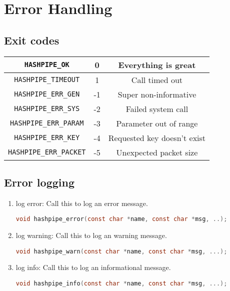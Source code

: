 \documentclass[12pt]{article}
\def\clst{\lstinline[basicstyle=\ttfamily,breaklines=true,language=C]}
\begin{document}
\section{Error Handling}

\subsection{Exit codes}
\vspace{1cm}
\begin{center}
\begin{tabular}{|c|c|c|}
\hline
{\tt HASHPIPE\_OK}          &  0 & Everything is great\\[0.25cm] 
\hline
{\tt HASHPIPE\_TIMEOUT}     &  1 & Call timed out \\[0.25cm]
\hline
{\tt HASHPIPE\_ERR\_GEN}    & -1 & Super non-informative \\[0.25cm]
\hline
{\tt HASHPIPE\_ERR\_SYS}    & -2 & Failed system call \\[0.25cm]
\hline
{\tt HASHPIPE\_ERR\_PARAM}  & -3 & Parameter out of range \\[0.25cm]
\hline
{\tt HASHPIPE\_ERR\_KEY}    & -4 & Requested key doesn't exist \\[0.25cm]
\hline
{\tt HASHPIPE\_ERR\_PACKET} & -5 & Unexpected packet size \\[0.25cm]
\hline
\end{tabular}
\end{center}

\subsection{Error logging}

\begin{enumerate}
\item log error: Call this to log an error message.

\clst{void hashpipe_error(const char *name, const char *msg, ..);}

\item log warning: Call this to log an warning message.

\clst{void hashpipe_warn(const char *name, const char *msg, ...);}

\item log info: Call this to log an informational message.

\clst{void hashpipe_info(const char *name, const char *msg, ...);}

\end{enumerate}
\end{document}
